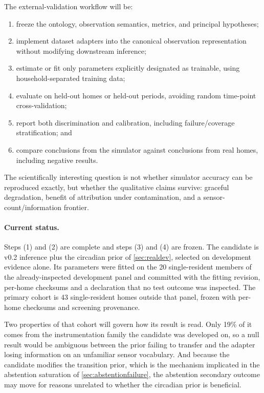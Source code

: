 \documentclass[11pt]{article}
\begin{document}
The external-validation workflow will be:
\begin{enumerate}[label=(\arabic*)]
    \item freeze the ontology, observation semantics, metrics, and principal hypotheses;
    \item implement dataset adapters into the canonical observation representation without modifying downstream inference;
    \item estimate or fit only parameters explicitly designated as trainable, using household-separated training data;
    \item evaluate on held-out homes or held-out periods, avoiding random time-point cross-validation;
    \item report both discrimination and calibration, including failure/coverage stratification; and
    \item compare conclusions from the simulator against conclusions from real homes, including negative results.
\end{enumerate}

The scientifically interesting question is not whether simulator accuracy can be
reproduced exactly, but whether the qualitative claims survive: graceful
degradation, benefit of attribution under contamination, and a
sensor-count/information frontier.

\paragraph{Current status.}
Steps (1) and (2) are complete and steps (3) and (4) are frozen. The candidate is
v0.2 inference plus the circadian prior of \cref{sec:realdev}, selected on
development evidence alone. Its parameters were fitted on the 20 single-resident
members of the already-inspected development panel and committed with the fitting
revision, per-home checksums and a declaration that no test outcome was
inspected. The primary cohort is 43 single-resident homes outside that panel,
frozen with per-home checksums and screening provenance.

Two properties of that cohort will govern how its result is read. Only 19\% of it
comes from the instrumentation family the candidate was developed on, so a null
result would be ambiguous between the prior failing to transfer and the adapter
losing information on an unfamiliar sensor vocabulary. And because the candidate
modifies the transition prior, which is the mechanism implicated in the
abstention saturation of \cref{sec:abstentionfailure}, the abstention secondary
outcome may move for reasons unrelated to whether the circadian prior is
beneficial.
\end{document}
